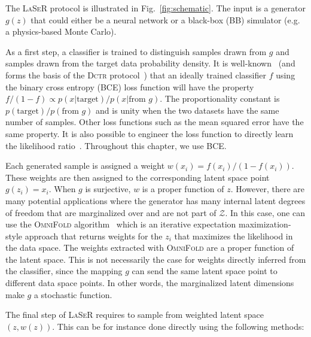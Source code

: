 The \textsc{LaSeR} protocol is illustrated in Fig.~\ref{fig:schematic}. The input is a generator $g(z)$ that could either be a neural network or a black-box (BB) simulator (e.g. a physics-based Monte Carlo).

As a first step, a classifier is trained to distinguish samples drawn from $g$ and samples drawn from the target data probability density. It is well-known~\cite{hastie01statisticallearning,sugiyama_suzuki_kanamori_2012} (and forms the basis of the \textsc{Dctr} protocol~\cite{1907.08209}) that an ideally trained classifier $f$ using the binary cross entropy (BCE) loss function will have the property $f/(1-f)\propto p(x|\text{target})/p(x|\text{from $g$})$. The proportionality constant is $p(\text{target})/p(\text{from $g$})$ and is unity when the two datasets have the same number of samples. Other loss functions such as the mean squared error have the same property. It is also possible to engineer the loss function to directly learn the likelihood ratio~\cite{DAgnolo:2018cun,Nachman:2021yvi}. Throughout this chapter, we use BCE.

Each generated sample is assigned a weight $w(x_i)=f(x_i)/(1-f(x_i))$. These weights are then assigned to the corresponding latent space point $g(z_i)=x_i$. When $g$ is surjective, $w$ is a proper function of $z$. However, there are many potential applications where the generator has many internal latent degrees of freedom that are marginalized over and are not part of $\mathcal{Z}$. In this case, one can use the \textsc{OmniFold} algorithm~\cite{Andreassen:2019cjw} which is an iterative expectation maximization-style approach that returns weights for the $z_i$ that maximizes the likelihood in the data space.  The weights extracted with \textsc{OmniFold} are a proper function of the latent space. This is not necessarily the case for weights directly inferred from the classifier, since the mapping $g$ can send the same latent space point to different data space points. In other words, the marginalized latent dimensions make $g$ a stochastic function.


The final step of \textsc{LaSeR} requires to sample from weighted latent space $(z,w(z))$. This can be for instance done directly using the following methods:

